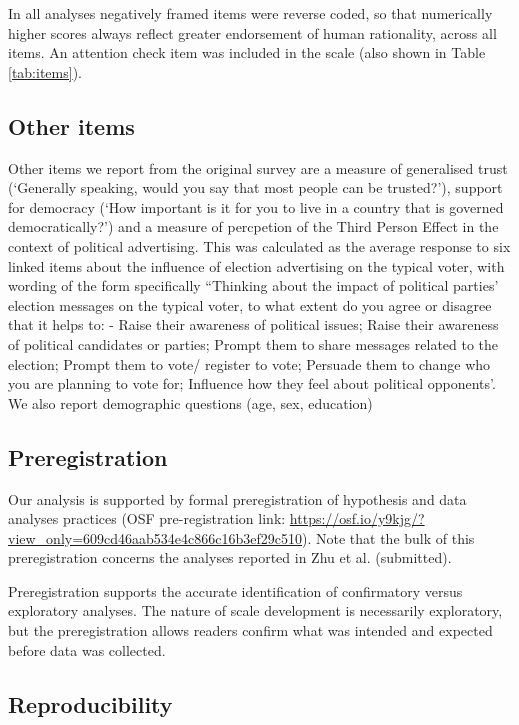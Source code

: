 \documentclass[
  ,jou,floatsintext]{apa6}
\begin{document}
In all analyses negatively framed items were reverse coded, so that numerically higher scores always reflect greater endorsement of human rationality, across all items. An attention check item was included in the scale (also shown in Table \ref{tab:items}).

\hypertarget{other-items}{%
\subsection{Other items}\label{other-items}}

Other items we report from the original survey are a measure of generalised trust (`Generally speaking, would you say that most people can be trusted?'), support for democracy (`How important is it for you to live in a country that is governed democratically?') and a measure of percpetion of the Third Person Effect in the context of political advertising. This was calculated as the average response to six linked items about the influence of election advertising on the typical voter, with wording of the form specifically ``Thinking about the impact of political parties' election messages on the typical voter, to what extent do you agree or disagree that it helps to: - Raise their awareness of political issues; Raise their awareness of political candidates or parties; Prompt them to share messages related to the election; Prompt them to vote/ register to vote; Persuade them to change who you are planning to vote for; Influence how they feel about political opponents'. We also report demographic questions (age, sex, education)

\hypertarget{preregistration}{%
\subsection{Preregistration}\label{preregistration}}

Our analysis is supported by formal preregistration of hypothesis and data analyses practices
(OSF pre-registration link: \url{https://osf.io/y9kjg/?view_only=609cd46aab534e4c866c16b3ef29c510}). Note that the bulk of this preregistration concerns the analyses reported in Zhu et al. (submitted).

Preregistration supports the accurate identification of confirmatory versus exploratory analyses. The nature of scale development is necessarily exploratory, but the preregistration allows readers confirm what was intended and expected before data was collected.

\hypertarget{reproducibility}{%
\subsection{Reproducibility}\label{reproducibility}}
\end{document}
